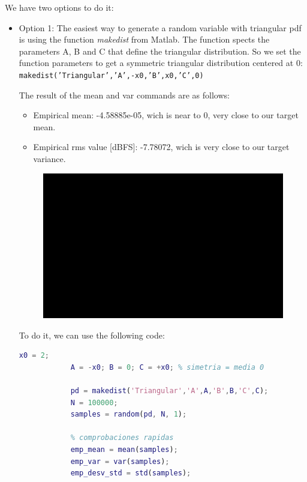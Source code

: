 \documentclass[11pt,a4paper]{article}
\begin{document}
\vspace{0.5cm}
We have two options to do it:
\begin{itemize}
    \item Option 1: The easiest way to generate a random variable with triangular pdf is using the function \textit{makedist} from Matlab.
    The function spects the parameters A, B and C that define the triangular distribution.
    So we set the function parameters to get a symmetric triangular distribution centered at 0: \texttt{makedist('Triangular','A',-x0,'B',x0,'C',0)}
    
    The result of the mean and var commands are as follows:
    \begin{itemize}
        \item Empirical mean: -4.58885e-05, wich is near to 0, very close to our target mean.
        \item Empirical rms value [dBFS]: -7.78072, wich is very close to our target variance.
    \end{itemize}
    
    \begin{figure}[H]
        \centering
        \includegraphics[width=1\textwidth]{img/task3_tri_mkdist.png}
        \label{fig:task3_tri_mkdist}
    \end{figure}

    To do it, we can use the following code:
        \begin{lstlisting}[language=Matlab]
            x0 = 2;
            A = -x0; B = 0; C = +x0; % simetria = media 0

            pd = makedist('Triangular','A',A,'B',B,'C',C);
            N = 100000;
            samples = random(pd, N, 1);

            % comprobaciones rapidas
            emp_mean = mean(samples);
            emp_var = var(samples);
            emp_desv_std = std(samples);


\end{lstlisting}
\end{itemize}
\end{document}
